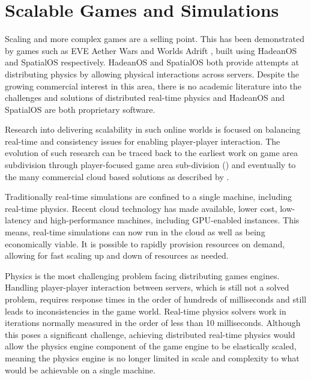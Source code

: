 \section{Scalable Games and Simulations}
Scaling and more complex games are a selling point. This has been demonstrated by games such as EVE Aether Wars \cite{AetherEngine} and Worlds Adrift \cite{WorldsAd48:online}, built using HadeanOS and SpatialOS respectively. HadeanOS and SpatialOS both provide attempts at distributing physics by allowing physical interactions across servers. Despite the growing commercial interest in this area, there is no academic literature into the challenges and solutions of distributed real-time physics and HadeanOS and SpatialOS are both proprietary software.

Research into delivering scalability in such online worlds is focused on balancing real-time and consistency issues for enabling player-player interaction. The evolution of such research can be traced back to the earliest work on game area subdivision \cite{Npsnet} through player-focused game area sub-division (\cite{Morgan2005InterestManagement, Greenhalgh}) and eventually to the many commercial cloud based solutions as described by \cite{iCloudAccess}.

Traditionally real-time simulations are confined to a single machine, including real-time physics. 
Recent cloud technology has made available, lower cost, low-latency and high-performance machines, including GPU-enabled instances. This means, real-time simulations can now run in the cloud as well as being economically viable. It is possible to rapidly provision resources on demand, allowing for fast scaling up and down of resources as needed.

Physics is the most challenging problem facing distributing games engines. Handling player-player interaction between servers, which is still not a solved problem, requires response times in the order of hundreds of milliseconds and still leads to inconsistencies in the game world. Real-time physics solvers work in iterations normally measured in the order of less than 10 milliseconds. Although this poses a significant challenge, achieving distributed real-time physics would allow the physics engine component of the game engine to be elastically scaled, meaning the physics engine is no longer limited in scale and complexity to what would be achievable on a single machine.


